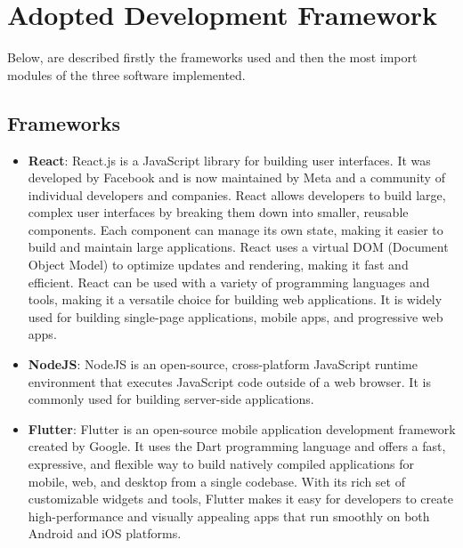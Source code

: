 \chapter{Adopted Development Framework}
Below, are described firstly the frameworks used and then the most import modules of the three software implemented.
\section{Frameworks}
\begin{itemize}
    \item \textbf{React}: React.js is a JavaScript library for building user interfaces. It was developed by Facebook and is now maintained by Meta and a community of individual developers and companies. React allows developers to build large, complex user interfaces by breaking them down into smaller, reusable components. Each component can manage its own state, making it easier to build and maintain large applications. React uses a virtual DOM (Document Object Model) to optimize updates and rendering, making it fast and efficient. React can be used with a variety of programming languages and tools, making it a versatile choice for building web applications. It is widely used for building single-page applications, mobile apps, and progressive web apps.
    \item \textbf{NodeJS}: NodeJS is an open-source, cross-platform JavaScript runtime environment that executes JavaScript code outside of a web browser. It is commonly used for building server-side applications.
    \item \textbf{Flutter}: Flutter is an open-source mobile application development framework created by Google. It uses the Dart programming language and offers a fast, expressive, and flexible way to build natively compiled applications for mobile, web, and desktop from a single codebase. With its rich set of customizable widgets and tools, Flutter makes it easy for developers to create high-performance and visually appealing apps that run smoothly on both Android and iOS platforms.
    \end{itemize}
